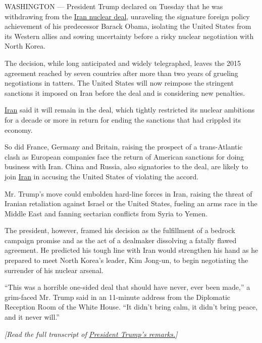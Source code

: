WASHINGTON --- President Trump declared on Tuesday that he was
withdrawing from the
\href{https://www.nytimes.com/2020/01/14/world/europe/iran-nuclear-deal.html}{Iran
nuclear deal}, unraveling the signature foreign policy achievement of
his predecessor Barack Obama, isolating the United States from its
Western allies and sowing uncertainty before a risky nuclear negotiation
with North Korea.

The decision, while long anticipated and widely telegraphed, leaves the
2015 agreement reached by seven countries after more than two years of
grueling negotiations in tatters. The United States will now reimpose
the stringent sanctions it imposed on Iran before the deal and is
considering new penalties.

\href{https://www.nytimes.com/2020/01/14/world/europe/iran-nuclear-deal.html}{Iran}
said it will remain in the deal, which tightly restricted its nuclear
ambitions for a decade or more in return for ending the sanctions that
had crippled its economy.

So did France, Germany and Britain, raising the prospect of a
trans-Atlantic clash as European companies face the return of American
sanctions for doing business with Iran. China and Russia, also
signatories to the deal, are likely to join
\href{https://www.nytimes.com/2020/01/14/world/europe/iran-nuclear-deal.html}{Iran}
in accusing the United States of violating the accord.

Mr. Trump's move could embolden hard-line forces in Iran, raising the
threat of Iranian retaliation against Israel or the United States,
fueling an arms race in the Middle East and fanning sectarian conflicts
from Syria to Yemen.

The president, however, framed his decision as the fulfillment of a
bedrock campaign promise and as the act of a dealmaker dissolving a
fatally flawed agreement. He predicted his tough line with Iran would
strengthen his hand as he prepared to meet North Korea's leader, Kim
Jong-un, to begin negotiating the surrender of his nuclear arsenal.

``This was a horrible one-sided deal that should have never, ever been
made,'' a grim-faced Mr. Trump said in an 11-minute address from the
Diplomatic Reception Room of the White House. ``It didn't bring calm, it
didn't bring peace, and it never will.''

\emph{{[}Read the full transcript of}
\href{https://www.nytimes.com/2018/05/08/us/politics/trump-speech-iran-deal.html?action=click\&module=Intentional\&pgtype=Article}{\emph{President
Trump's remarks.}}\emph{{]}}

